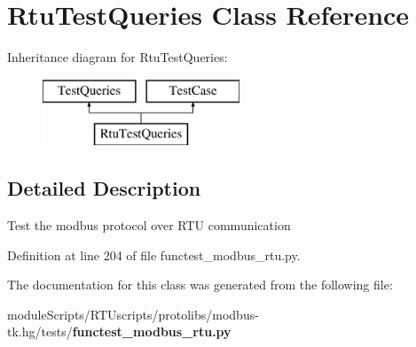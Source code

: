 \section{Rtu\+Test\+Queries Class Reference}
\label{classtests_1_1functest__modbus__rtu_1_1_rtu_test_queries}
Inheritance diagram for Rtu\+Test\+Queries\+:\begin{figure}[H]
\begin{center}
\leavevmode
\includegraphics[height=2.000000cm]{classtests_1_1functest__modbus__rtu_1_1_rtu_test_queries}
\end{center}
\end{figure}


\subsection{Detailed Description}
\begin{DoxyVerb}Test the modbus protocol over RTU communication\end{DoxyVerb}
 

Definition at line 204 of file functest\+\_\+modbus\+\_\+rtu.\+py.



The documentation for this class was generated from the following file\+:\begin{DoxyCompactItemize}
\item 
module\+Scripts/\+R\+T\+Uscripts/protolibs/modbus-\/tk.\+hg/tests/{\bf functest\+\_\+modbus\+\_\+rtu.\+py}\end{DoxyCompactItemize}
